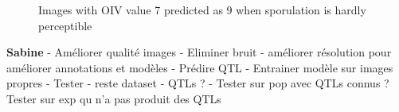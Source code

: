 \documentclass[english]{article}
\begin{document}
\begin{figure}[H]
\begin{subfigure}[b]{0.45\linewidth}
        \caption{}\label{fig:error79b}
    \end{subfigure}
    \caption{Images with OIV value 7 predicted as 9 when sporulation is hardly perceptible}\label{fig:errors79}
\end{figure}

\textbf{Sabine}
- Améliorer qualité images
- Eliminer bruit
- améliorer résolution pour améliorer annotations et modèles
- Prédire QTL
- Entrainer modèle sur images propres
- Tester
- reste dataset
- QTLs ?
- Tester sur pop avec QTLs connus ?
Tester sur exp qu n'a pas produit des QTLs
\end{document}
